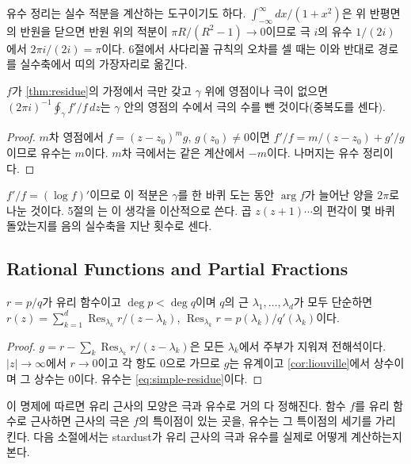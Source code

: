 유수 정리는 실수 적분을 계산하는 도구이기도 하다. $\int_{-\infty}^\infty dx/(1+x^2)$은 위 반평면의 반원을 닫으면 반원 위의 적분이 $\pi R/(R^2-1)\to0$이므로 극 $i$의 유수 $1/(2i)$에서 $2\pi i/(2i)=\pi$이다. 6절에서 사다리꼴 규칙의 오차를 셀 때는 이와 반대로 경로를 실수축에서 띠의 가장자리로 옮긴다.

\begin{corollary}[편각 원리]
\label{cor:argument}
$f$가 \cref{thm:residue}의 가정에서 극만 갖고 $\gamma$ 위에 영점이나 극이 없으면 $(2\pi i)^{-1}\oint_\gamma f'/f\,dz$는 $\gamma$ 안의 영점의 수에서 극의 수를 뺀 것이다(중복도를 센다).
\end{corollary}

\begin{proof}
$m$차 영점에서 $f=(z-z_0)^mg$, $g(z_0)\ne0$이면 $f'/f=m/(z-z_0)+g'/g$이므로 유수는 $m$이다. $m$차 극에서는 같은 계산에서 $-m$이다. 나머지는 유수 정리이다.
\end{proof}

$f'/f=(\log f)'$이므로 이 적분은 $\gamma$를 한 바퀴 도는 동안 $\arg f$가 늘어난 양을 $2\pi$로 나눈 것이다. 5절의 는 이 생각을 이산적으로 쓴다. 곱 $z(z+1)\cdots$의 편각이 몇 바퀴 돌았는지를 음의 실수축을 지난 횟수로 센다.

\subsection{Rational Functions and Partial Fractions}

\begin{proposition}[부분 분수]
\label{prop:partial-fractions}
$r=p/q$가 유리 함수이고 $\deg p<\deg q$이며 $q$의 근 $\lambda_1,\dots,\lambda_d$가 모두 단순하면 $r(z)=\sum_{k=1}^d\operatorname{Res}_{\lambda_k}r/(z-\lambda_k)$, $\operatorname{Res}_{\lambda_k}r=p(\lambda_k)/q'(\lambda_k)$이다.
\end{proposition}

\begin{proof}
$g=r-\sum_k\operatorname{Res}_{\lambda_k}r/(z-\lambda_k)$은 모든 $\lambda_k$에서 주부가 지워져 전해석이다. $|z|\to\infty$에서 $r\to0$이고 각 항도 $0$으로 가므로 $g$는 유계이고 \cref{cor:liouville}에서 상수이며 그 상수는 $0$이다. 유수는 \cref{eq:simple-residue}이다.
\end{proof}

이 명제에 따르면 유리 근사의 모양은 극과 유수로 거의 다 정해진다. 함수 $f$를 유리 함수로 근사하면 근사의 극은 $f$의 특이점이 있는 곳을, 유수는 그 특이점의 세기를 가리킨다. 다음 소절에서는 stardust가 유리 근사의 극과 유수를 실제로 어떻게 계산하는지 본다.


